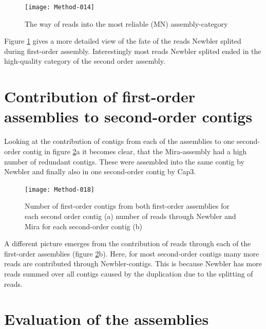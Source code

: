 \documentclass[12pt,a4paper]{article}
\begin{document}
\newpage

\begin{figure}[H]
  \centering
  

\texttt{[image: Method-014]}

  \caption{The way of reads into the most reliable (MN) assembly-category}
  \label{fig:venncat}
\end{figure}

Figure \ref{fig:venncat} gives a more detailed view of the fate of the
reads Newbler splited during first-order assembly. Interestingly most
reads Newbler splited ended in the high-quality category of the second
order assembly.

\section{Contribution of first-order assemblies to second-order contigs}
\label{sec:contr-firs-order}

  

Looking at the contribution of contigs from each of the assemblies to
one second-order contig in figure \ref{fig:rcp}a it becomes clear,
that the Mira-assembly had a high number of redundant contigs. These
were assembled into the same contig by Newbler and finally also in one
second-order contig by Cap3.


\begin{figure}[H]
  \centering

\texttt{[image: Method-018]}


\caption{Number of first-order contigs from both first-order
  assemblies for each second order contig (a) number of reads through
  Newbler and Mira for each second-order contig (b)}
\label{fig:rcp}
  
\end{figure}


A different picture emerges from the contribution of reads through
each of the first-order assemblies (figure \ref{fig:rcp}b).  Here, for
most second-order contigs many more reads are contributed through
Newbler-contigs. This is because Newbler has more reads summed over
all contigs caused by the duplication due to the splitting of reads.

\newpage

\section{Evaluation of the assemblies}
\label{sec:eval-three-assembl}
\end{document}
